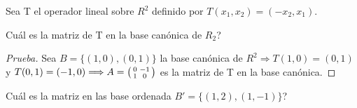 \documentclass[12pt]{article}
\newenvironment{problem}[2][Problem]{\begin{trivlist}
\item[\hskip \labelsep {\bfseries #1}\hskip \labelsep {\bfseries #2.}]}{\end{trivlist}}
\newenvironment{xmat}
  {\left(\begin{smallmatrix}}
  {\end{smallmatrix}\right)}
\begin{document}
\begin{problem}[Problema]{4}
Sea T el operador lineal sobre $R^{2}$ definido por  $T(x_{1},x_{2})=(-x_{2},x_{1})$.
\end{problem}

\begin{problem}[Problema]{4.a}
Cuál es la matriz de T en la base canónica de $R_{2}$?
\end{problem}

\begin{proof} [Prueba]
Sea $B=\{(1,0), (0,1)\}$ la base canónica de $R^{2} \Longrightarrow T(1,0)=(0,1)$ y $T(0,1)=(-1,0) \Longrightarrow A=\begin{xmat}0 & -1\\1 & 0\end{xmat}$ es la matriz de T en la base canónica.
\end{proof} 

\begin{problem}[Problema]{4.b}
Cuál es la matriz en las base ordenada $B'=\{(1,2), (1,-1)\}$?
\end{problem}
\end{document}
